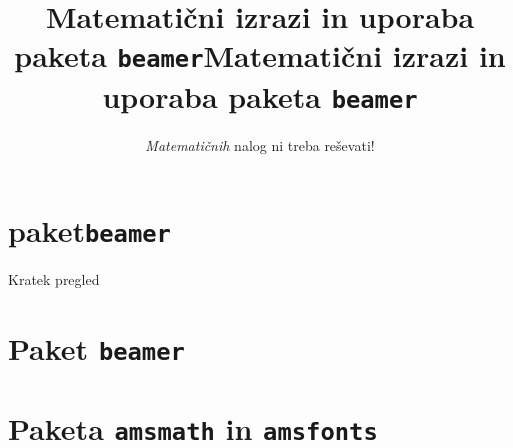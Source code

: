 \documentclass{beamer}
\begin{document}
\title{ Matematični izrazi in uporaba paketa \texttt{beamer}}
\section{paket\texttt{beamer}}



\title{Matematični izrazi in uporaba paketa \texttt{beamer}}
\subtitle{\emph{Matematičnih} nalog ni treba reševati!}
\date{} 
\titlepage

\begin{frame}{Kratek pregled}
    \tableofcontents[pausesections]
\end{frame}


\section{Paket \texttt{beamer}}



\section{Paketa \texttt{amsmath} in \texttt{amsfonts}}


\end{document}
